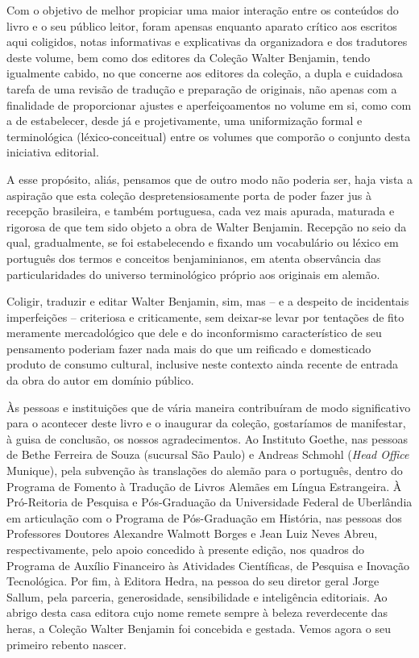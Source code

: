 Com o objetivo de melhor propiciar uma maior interação entre os
conteúdos do livro e o seu público leitor, foram apensas enquanto
aparato crítico aos escritos aqui coligidos, notas informativas e
explicativas da organizadora e dos tradutores deste volume, bem como dos
editores da Coleção Walter Benjamin, tendo igualmente cabido, no que
concerne aos editores da coleção, a dupla e cuidadosa tarefa de uma
revisão de tradução e preparação de originais, não apenas com a
finalidade de proporcionar ajustes e aperfeiçoamentos no volume em si,
como com a de estabelecer, desde já e projetivamente, uma uniformização
formal e terminológica (léxico-conceitual) entre os volumes que comporão
o conjunto desta iniciativa editorial.

A esse propósito, aliás, pensamos que de outro modo não poderia ser,
haja vista a aspiração que esta coleção despretensiosamente porta de
poder fazer jus à recepção brasileira, e também portuguesa, cada vez
mais apurada, maturada e rigorosa de que tem sido objeto a obra de
Walter Benjamin. Recepção no seio da qual, gradualmente, se foi
estabelecendo e fixando um vocabulário ou léxico em português dos termos
e conceitos benjaminianos, em atenta observância das particularidades do
universo terminológico próprio aos originais em alemão.

Coligir, traduzir e editar Walter Benjamin, sim, mas -- e a despeito de
incidentais imperfeições -- criteriosa e criticamente, sem deixar-se
levar por tentações de fito meramente mercadológico que dele e do
inconformismo característico de seu pensamento poderiam fazer nada mais
do que um reificado e domesticado produto de consumo cultural, inclusive
neste contexto ainda recente de entrada da obra do autor em domínio
público.

Às pessoas e instituições que de vária maneira contribuíram de modo
significativo para o acontecer deste livro e o inaugurar da coleção,
gostaríamos de manifestar, à guisa de conclusão, os nossos
agradecimentos. Ao Instituto Goethe, nas pessoas de Bethe Ferreira de
Souza (sucursal São Paulo) e Andreas Schmohl (\emph{Head Office}
Munique), pela subvenção às translações do alemão para o português,
dentro do Programa de Fomento à Tradução de Livros Alemães em Língua
Estrangeira. À Pró-Reitoria de Pesquisa e Pós-Graduação da Universidade
Federal de Uberlândia em articulação com o Programa de Pós-Graduação em
História, nas pessoas dos Professores Doutores Alexandre Walmott Borges
e Jean Luiz Neves Abreu, respectivamente, pelo apoio concedido à
presente edição, nos quadros do Programa de Auxílio Financeiro às
Atividades Científicas, de Pesquisa e Inovação Tecnológica. Por fim, à
Editora Hedra, na pessoa do seu diretor geral Jorge Sallum, pela
parceria, generosidade, sensibilidade e inteligência editoriais. Ao
abrigo desta casa editora cujo nome remete sempre à beleza reverdecente
das heras, a Coleção Walter Benjamin foi concebida e gestada. Vemos
agora o seu primeiro rebento nascer.



